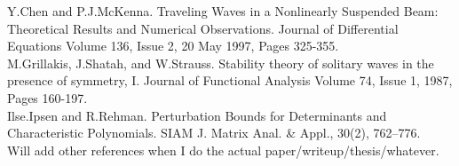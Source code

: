 \documentclass[12pt]{article}
\begin{document}
Y.Chen and P.J.McKenna. Traveling Waves in a Nonlinearly Suspended Beam: Theoretical Results and Numerical Observations. Journal of Differential Equations Volume 136, Issue 2, 20 May 1997, Pages 325-355.\\

M.Grillakis, J.Shatah, and W.Strauss. Stability theory of solitary waves in the presence of symmetry, I. Journal of Functional Analysis Volume 74, Issue 1, 1987, Pages 160-197.\\

Ilse.Ipsen and R.Rehman. Perturbation Bounds for Determinants and Characteristic Polynomials. SIAM J. Matrix Anal. \& Appl., 30(2), 762–776.\\

Will add other references when I do the actual paper/writeup/thesis/whatever.
\end{document}

